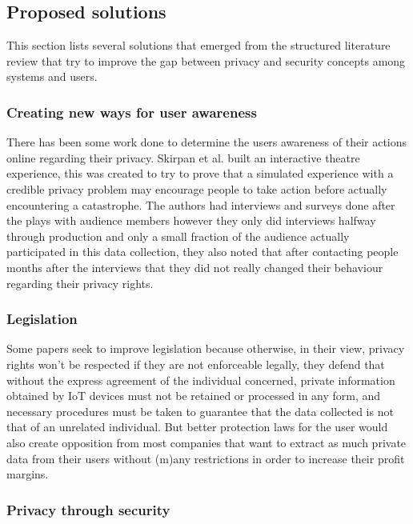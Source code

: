 \documentclass[manuscript,natbib=false]{acmart}
\begin{document}
\subsection{Proposed solutions}

\par This section lists several solutions that emerged from the structured
literature review that try to improve the gap between privacy and security concepts
among systems and users.

\subsubsection{Creating new ways for user awareness}

There has been some work done to determine the users awareness of their
actions online regarding their privacy. Skirpan et al. \cite{SkirpanPrivacy}
built an interactive theatre experience, this was created to try to prove
that a simulated experience with a credible privacy problem may encourage
people to take action before actually encountering a catastrophe.
The authors had interviews and surveys
done after the plays with audience members however they only did interviews
halfway through production and only a small fraction of the audience actually
participated in this data collection, they also noted that after contacting
people months after the interviews that they did not really changed their
behaviour regarding their privacy rights.

\subsubsection{Legislation}

Some papers seek to improve legislation \cite{WEBER2015618, FabianoInternet}
because otherwise, in their view, privacy rights won't be respected if they
are not enforceable legally, they defend that without the express agreement
of the individual concerned, private information obtained by IoT devices
must not be retained or processed in any form, and necessary procedures
must be taken to guarantee that the data collected is not that of an unrelated
individual. But better protection laws for the user would also create opposition
from most companies that want to extract as much private data from their
users without (m)any restrictions in order to increase their profit margins.

\subsubsection{Privacy through security}
\end{document}
